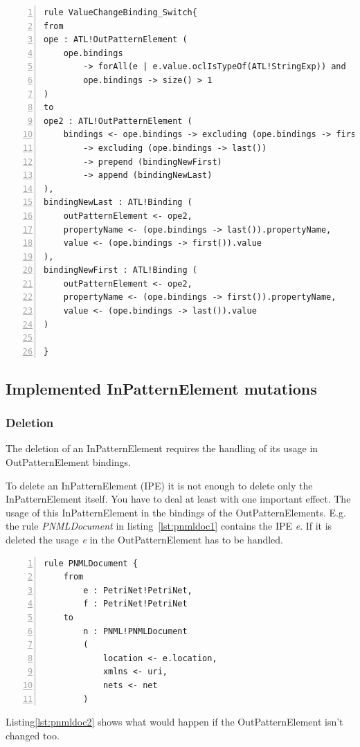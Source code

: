 \documentclass{llncs}
\begin{document}
\begin{lstlisting}[language=ATL, numbers=left,xleftmargin=5.0ex, caption=ValueChangeBinding-Definition using values from input models., label=lst:2ndOrderHOT]
rule ValueChangeBinding_Switch{
from
ope : ATL!OutPatternElement (
	ope.bindings 
		-> forAll(e | e.value.oclIsTypeOf(ATL!StringExp)) and
		ope.bindings -> size() > 1
)
to
ope2 : ATL!OutPatternElement (
	bindings <- ope.bindings -> excluding (ope.bindings -> first()) 
		-> excluding (ope.bindings -> last())
		-> prepend (bindingNewFirst)
		-> append (bindingNewLast)
), 
bindingNewLast : ATL!Binding (
	outPatternElement <- ope2, 
	propertyName <- (ope.bindings -> last()).propertyName,
	value <- (ope.bindings -> first()).value
),
bindingNewFirst : ATL!Binding (
	outPatternElement <- ope2,
	propertyName <- (ope.bindings -> first()).propertyName,
	value <- (ope.bindings -> last()).value	
)
	
}
\end{lstlisting}

\subsection{Implemented InPatternElement mutations}

\subsubsection{Deletion}

The deletion of an InPatternElement requires the handling of its usage in OutPatternElement bindings.

To delete an InPatternElement (IPE) it is not enough to delete only the InPatternElement itself. You have to deal at least with one important effect. The usage of this InPatternElement in the bindings of the OutPatternElements. E.g. the rule \emph{PNMLDocument} in listing~\ref{lst:pnmldoc1} contains the IPE \emph{e}. If it is deleted the usage \emph{e} in the OutPatternElement has to be handled.


\begin{lstlisting}[language=ATL, numbers=left,xleftmargin=5.0ex,label=lst:pnmldoc1]
rule PNMLDocument {
	from
		e : PetriNet!PetriNet,
		f : PetriNet!PetriNet
	to	
		n : PNML!PNMLDocument
		(
			location <- e.location,
			xmlns <- uri,
			nets <- net			
		)
\end{lstlisting}

Listing\ref{lst:pnmldoc2} shows what would happen if the OutPatternElement isn't changed too.
\end{document}
